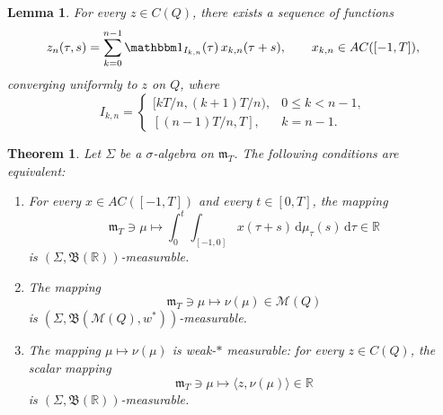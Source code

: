 \documentclass[10pt,a4paper]{amsart}
\newtheorem{lemma}{Lemma}
\newtheorem{theorem}{Theorem}
\newcommand{\dd}{\ensuremath{\mathrm{d}}}
\begin{document}
\begin{lemma}\label{lem:delay-test-approximation}
For every $z\in C(Q)$, there exists a sequence
of functions
\begin{equation*}
    z_n(\tau,s)
    =
    \sum_{k=0}^{n-1}
    \mathbbm 1_{I_{k,n}}(\tau)\,x_{k,n}(\tau+s),
    \qquad
    x_{k,n}\in AC([-1,T]),
\end{equation*}
converging uniformly to $z$ on $Q$, where
\begin{equation*}
    I_{k,n}
    =
    \begin{cases}
        [kT/n,(k+1)T/n),
        & 0\le k<n-1,\\
        [(n-1)T/n,T],
        & k=n-1.
    \end{cases}
\end{equation*}
\end{lemma}

\begin{theorem}\label{thm:equivalent-parameter-measurability}
Let $\Sigma$ be a $\sigma$-algebra on $\mathfrak m_T$.
The following conditions are equivalent:
\begin{enumerate}[label=\textup{(}\roman*\textup{)}, ref=\textup{(}\emph{\roman*}\textup{)}]
\item\label{thm:equivalent-parameter-measurability-i}    For every $x\in AC([-1,T])$ and every
    $t\in[0,T]$, the mapping
    \begin{equation*}
        \mathfrak m_T\ni\mu
        \mapsto
        \int_0^t\int_{[-1,0]}
        x(\tau+s)\,\dd\mu_\tau(s)\,\dd\tau
        \in\mathbb R
    \end{equation*}
    is $(\Sigma,\mathfrak B(\mathbb R))$-measurable.
\item\label{thm:equivalent-parameter-measurability-ii}The mapping
    \begin{equation*}
        \mathfrak m_T\ni\mu
        \mapsto\nu(\mu)\in\mathcal M(Q)
    \end{equation*}
    is $(\Sigma,\mathfrak B(\mathcal M(Q),w^*))$-measurable.
\item\label{thm:equivalent-parameter-measurability-iii}The mapping $\mu\mapsto\nu(\mu)$ is weak-$*$ measurable:
    for every $z\in C(Q)$, the scalar mapping
    \begin{equation*}
        \mathfrak m_T\ni\mu
        \mapsto\langle z,\nu(\mu)\rangle\in\mathbb R
    \end{equation*}
    is $(\Sigma,\mathfrak B(\mathbb R))$-measurable.
\end{enumerate}
\end{theorem}
\end{document}
